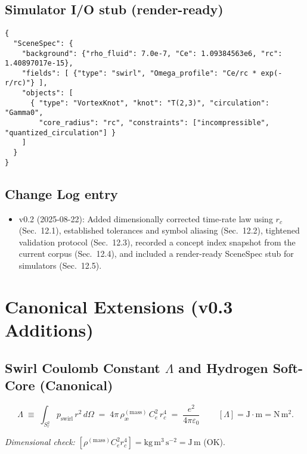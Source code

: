\documentclass[11pt, a4paper]{article}
\begin{document}
\subsection*{ Simulator I/O stub (render-ready)}

\begin{verbatim}
{
  "SceneSpec": {
    "background": {"rho_fluid": 7.0e-7, "Ce": 1.09384563e6, "rc": 1.40897017e-15},
    "fields": [ {"type": "swirl", "Omega_profile": "Ce/rc * exp(-r/rc)"} ],
    "objects": [
      { "type": "VortexKnot", "knot": "T(2,3)", "circulation": "Gamma0",
        "core_radius": "rc", "constraints": ["incompressible", "quantized_circulation"] }
    ]
  }
}
\end{verbatim}

\subsection*{ Change Log entry}

\begin{itemize}
    \item v0.2 (2025-08-22): Added dimensionally corrected time-rate law using $r_c$ (Sec.~12.1), established tolerances and symbol aliasing (Sec.~12.2), tightened validation protocol (Sec.~12.3), recorded a concept index snapshot from the current corpus (Sec.~12.4), and included a render-ready SceneSpec stub for simulators (Sec.~12.5).
\end{itemize}


\section{Canonical Extensions (v0.3 Additions)}

\subsection{Swirl Coulomb Constant $\Lambda$ and Hydrogen Soft-Core (Canonical)}
\label{subsec:canon-lambda}
\begin{definition}
    \[
        \boxed{\, \Lambda \;\equiv\; \int_{S_r^2} p_{\text{swirl}}\, r^2\, d\Omega
        \;=\; 4\pi\,\rho_{\text{\ae}}^{(\text{mass})}\,C_e^2\,r_c^4
        \;=\; \frac{e^2}{4\pi\varepsilon_0} \,}
        \qquad [\Lambda]=\mathrm{J\cdot m}=\mathrm{N\,m^2}.
    \]
\end{definition}
\noindent\textit{Dimensional check: }
$[\rho^{(\text{mass})} C_e^2 r_c^4]=\mathrm{kg\,m^3\,s^{-2}}=\mathrm{J\,m}$ (OK).
\end{document}
